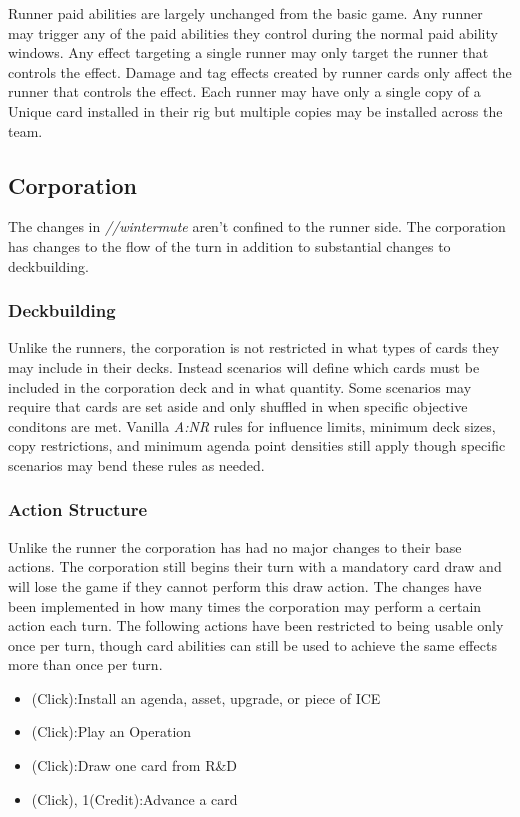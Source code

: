 \documentclass[titlepage]{article}
\begin{document}
Runner paid abilities are largely unchanged from the basic game. Any runner may trigger any of the paid abilities they control during the normal paid ability windows. Any effect targeting a single runner may only target the runner that controls the effect. Damage and tag effects created by runner cards only affect the runner that controls the effect. Each runner may have only a single copy of a Unique card installed in their rig but multiple copies may be installed across the team.

\subsection{Corporation}

The changes in \emph{//wintermute} aren't confined to the runner side. The corporation has changes to the flow of the turn in addition to substantial changes to deckbuilding.

\subsubsection{Deckbuilding}

Unlike the runners, the corporation is not restricted in what types of cards they may include in their decks. Instead scenarios will define which cards must be included in the corporation deck and in what quantity. Some scenarios may require that cards are set aside and only shuffled in when specific objective conditons are met. Vanilla \emph{A:NR} rules for influence limits, minimum deck sizes, copy restrictions, and minimum agenda point densities still apply though specific scenarios may bend these rules as needed.

\subsubsection{Action Structure}

Unlike the runner the corporation has had no major changes to their base actions. The corporation still begins their turn with a mandatory card draw and will lose the game if they cannot perform this draw action. The changes have been implemented in how many times the corporation may perform a certain action each turn. The following actions have been restricted to being usable only once per turn, though card abilities can still be used to achieve the same effects more than once per turn.
\begin{itemize}
	\item (Click):Install an agenda, asset, upgrade, or piece of ICE
	\item (Click):Play an Operation
	\item (Click):Draw one card from R\&D
	\item (Click), 1(Credit):Advance a card
\end{itemize}
\end{document}
